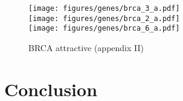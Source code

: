\begin{figure}[htb]
\centering
\texttt{[image: figures/genes/brca\_3\_a.pdf]}\\[2em]
\texttt{[image: figures/genes/brca\_2\_a.pdf]}\\[2em]
\texttt{[image: figures/genes/brca\_6\_a.pdf]}\\[2em]
\caption{BRCA attractive (appendix II)}
\end{figure}

\section{Conclusion}